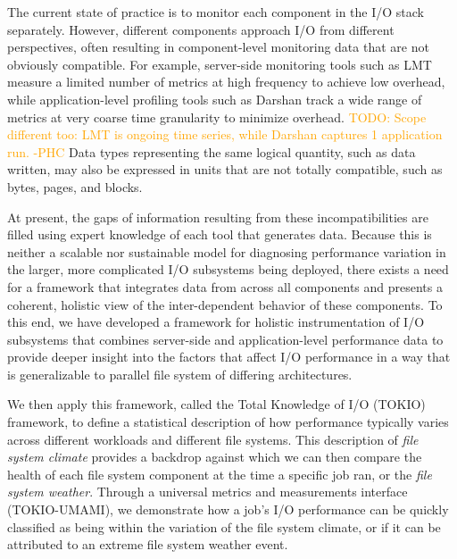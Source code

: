 \documentclass[conference,10pt,compsocconf]{IEEEtran}
\newcommand{\todo}[1]{\textcolor{Orange}{TODO: #1}}
\begin{document}
The current state of practice is to monitor each component in the I/O stack
separately.  However, different components approach I/O from different
perspectives, often resulting in component-level monitoring data that are not
obviously compatible.  For example, server-side monitoring tools such as
LMT\cite{lmt} measure a limited number of metrics at high frequency to achieve
low overhead, while application-level profiling tools such as
Darshan\cite{carns200924} track a wide range of metrics at very coarse time
granularity to minimize overhead.  \todo{Scope different too: LMT is ongoing
time series, while Darshan captures 1 application run. -PHC}
Data types representing the same logical
quantity, such as data written, may also be expressed in units that are not
totally compatible, such as bytes, pages, and blocks.


At present, the gaps of information resulting from these incompatibilities are
filled using expert knowledge of each tool that generates data.  Because this is
neither a scalable nor sustainable model for diagnosing performance variation in
the larger, more complicated I/O subsystems being deployed, there exists a need
for a framework that integrates data from across all components and presents a
coherent, holistic view of the inter-dependent behavior of these components.  To
this end, we have developed a framework for holistic instrumentation of I/O
subsystems that combines server-side and application-level performance data to
provide deeper insight into the factors that affect I/O performance in a way
that is generalizable to parallel file system of differing architectures.

We then apply this framework, called the Total Knowledge of I/O (TOKIO) framework, to define a statistical description of how performance typically varies across different workloads and different file systems.  This description of \emph{file system climate} provides a backdrop against which we can then compare the health of each file system component at the time a specific job ran, or the \emph{file system weather}.  Through a universal metrics and measurements interface (TOKIO-UMAMI), we demonstrate how a job's I/O performance can be quickly classified as being within the variation of the file system climate, or if it can be attributed to an extreme file system weather event.
\end{document}
